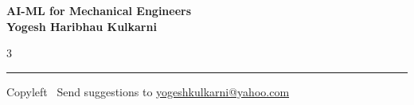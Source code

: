 \documentclass[8pt,landscape]{article}
\begin{document}
\footnotesize

\begin{center}
\Large{\textbf{AI-ML for Mechanical Engineers\\ Yogesh Haribhau Kulkarni}}
\end{center}

\begin{multicols}{3}

\end{multicols}

\rule{\linewidth}{0.25pt}
\scriptsize
Copyleft \textcopyleft\  Send suggestions to
\href{http://www.yogeshkulkarni.com}{yogeshkulkarni@yahoo.com}
\end{document}
